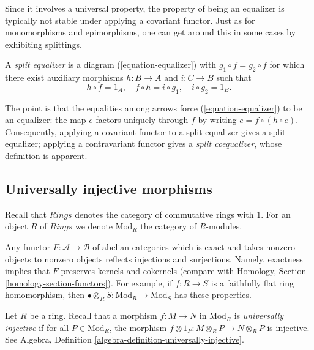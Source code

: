 \medskip\noindent
Since it involves a universal property, the property of being an equalizer is 
typically not stable under applying a covariant functor. Just as for
monomorphisms and epimorphisms, one can get around this in some
cases by exhibiting splittings.

\begin{definition}
\label{definition-split-equalizer}
A {\it split equalizer} is a diagram (\ref{equation-equalizer}) with
$g_1 \circ f = g_2 \circ f$ for which there exist auxiliary morphisms
$h : B \to A$ and $i : C \to B$ such that
\begin{equation}
\label{equation-split-equalizer-conditions}
h \circ f = 1_A, \quad f \circ h = i \circ g_1, \quad i \circ g_2 = 1_B.
\end{equation}
\end{definition}

\noindent
The point is that the equalities among arrows force (\ref{equation-equalizer}) 
to be an equalizer: the map $e$ factors uniquely through $f$ by writing
$e = f \circ (h \circ e)$. Consequently, applying a covariant functor
to a split equalizer gives a split equalizer; applying a contravariant functor 
gives a {\it split coequalizer}, whose definition is apparent.

\subsection{Universally injective morphisms}
\label{subsection-universally-injective}

\noindent
Recall that $\textit{Rings}$ denotes the category of commutative rings
with $1$. For an object $R$ of $\textit{Rings}$ we denote $\text{Mod}_R$
the category of $R$-modules.

\begin{remark}
\label{remark-reflects}
Any functor $F : \mathcal{A} \to \mathcal{B}$ of abelian categories
which is exact and takes nonzero objects to nonzero objects reflects
injections and surjections. Namely, exactness implies that
$F$ preserves kernels and cokernels (compare with
Homology, Section \ref{homology-section-functors}).
For example, if $f : R \to S$ is a 
faithfully flat ring homomorphism, then
$\bullet \otimes_R S: \text{Mod}_R \to \text{Mod}_S$ has these properties.
\end{remark}

\noindent
Let $R$ be a ring. Recall that a morphism $f : M \to N$ in $\text{Mod}_R$
is {\it universally injective} if for all $P \in \text{Mod}_R$,
the morphism $f \otimes 1_P: M \otimes_R P \to N \otimes_R P$ is injective.
See Algebra, Definition \ref{algebra-definition-universally-injective}.


